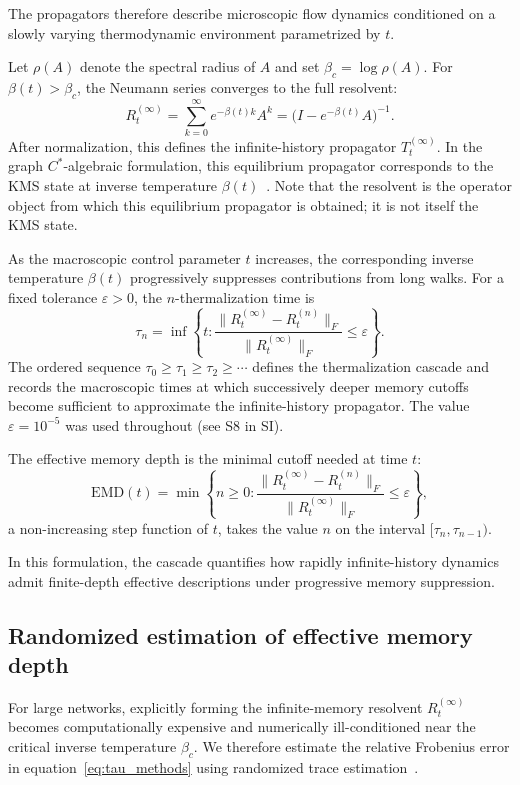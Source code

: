 \documentclass[aps,superscriptaddress,11pt]{revtex4-2}
\theoremstyle{definition}
\theoremstyle{plain}
\begin{document}
The propagators therefore describe microscopic flow dynamics conditioned on
a slowly varying thermodynamic environment parametrized by $t$.

Let $\rho(A)$ denote the spectral radius of $A$ and set
$\beta_c = \log\rho(A)$. For $\beta(t) > \beta_c$, the Neumann series
converges to the full resolvent:
\begin{equation}
  R_t^{(\infty)} = \sum_{k=0}^{\infty} e^{-\beta(t)k} A^k
  = \bigl(I - e^{-\beta(t)} A\bigr)^{-1}.
  \label{eq:resolvent_full_methods}
\end{equation}
After normalization, this defines the infinite-history propagator
$T_t^{(\infty)}$. In the graph $C^\ast$-algebraic formulation, this
equilibrium propagator corresponds to the KMS state at inverse temperature
$\beta(t)$~\cite{Moutuou2025a,Moutuou2025b}. Note that the resolvent is the
operator object from which this equilibrium propagator is obtained;
it is not itself the KMS state.

As the macroscopic control parameter $t$ increases, the corresponding
inverse temperature $\beta(t)$ progressively suppresses contributions from
long walks. For a fixed tolerance $\varepsilon > 0$, the $n$-thermalization time is
\begin{equation}
  \tau_n = \inf\!\left\{
    t : \frac{\|R_t^{(\infty)} - R_t^{(n)}\|_F}{\|R_t^{(\infty)}\|_F}
    \leq \varepsilon
  \right\}.
  \label{eq:tau_methods}
\end{equation}
The ordered sequence $\tau_0 \ge \tau_1 \ge \tau_2 \ge \cdots$ defines the
thermalization cascade and records the macroscopic times at which
successively deeper memory cutoffs become sufficient to approximate the
infinite-history propagator. The value $\varepsilon = 10^{-5}$ was used
throughout (see S8 in SI).

The effective memory depth is the minimal cutoff needed at time $t$:
\begin{equation}
  \mathrm{EMD}(t) = \min\!\left\{
    n \geq 0 : \frac{\|R_t^{(\infty)} - R_t^{(n)}\|_F}{\|R_t^{(\infty)}\|_F}
    \leq \varepsilon
  \right\},
  \label{eq:emd_methods}
\end{equation}
a non-increasing step function of $t$, takes the value $n$ on the interval
$[\tau_n, \tau_{n-1})$.

In this formulation, the cascade quantifies how rapidly infinite-history
dynamics admit finite-depth effective descriptions under progressive memory
suppression.

\subsection{Randomized estimation of effective memory depth}
For large networks, explicitly forming the infinite-memory resolvent
$R_t^{(\infty)}$ becomes computationally expensive and numerically
ill-conditioned near the critical inverse temperature $\beta_c$. We
therefore estimate the relative Frobenius error in
equation~\eqref{eq:tau_methods} using randomized trace
estimation~\cite{Hutchinson1990,Avron2011}.
\end{document}
